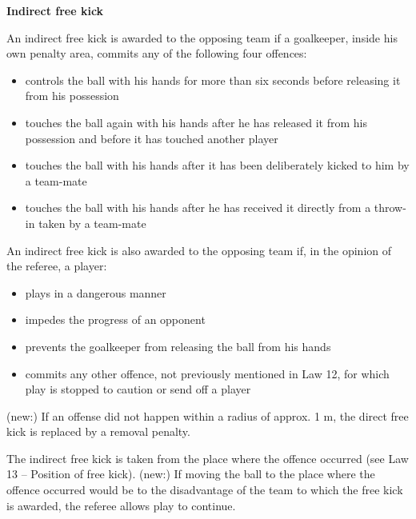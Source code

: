 
\bigskip

{\color{magenta}
{\bfseries Indirect free kick}

\headlinebox

An indirect free kick is awarded to the opposing team if a goalkeeper, inside his own penalty area, commits any of the following four offences: 

\begin{itemize}
\item controls the ball with his hands for more than six seconds before releasing it from his possession
\item touches the ball again with his hands after he has released it from his possession and before it has touched another player
\item touches the ball with his hands after it has been deliberately kicked to him by a team-mate
\item touches the ball with his hands after he has received it directly from a throw-in taken by a team-mate
\end{itemize}

\bigskip

An indirect free kick is also awarded to the opposing team if, in the opinion of the referee, a player:

\begin{itemize}
\item plays in a dangerous manner
\item impedes the progress of an opponent
\item prevents the goalkeeper from releasing the ball from his hands
\item commits any other offence, not previously mentioned in Law 12, for which play is stopped to caution or send off a player
\end{itemize}

\bigskip

(new:) If an offense did not happen within a radius of approx. 1 m, the direct free kick is replaced by a removal penalty.

\bigskip

The indirect free kick is taken from the place where the offence occurred (see Law 13 -- Position of free kick). (new:) If moving the ball to the place where the offence occurred would be to the disadvantage of the team to which the free kick is awarded, the referee allows play to continue.

}
